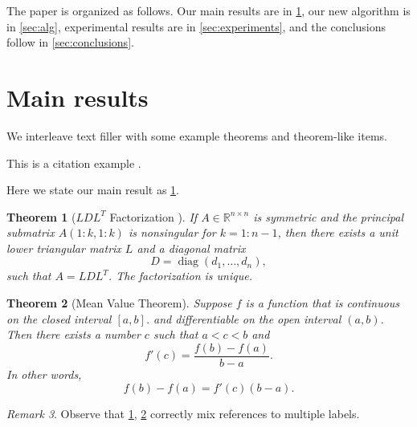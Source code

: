 \documentclass[10pt,reqno,final]{article}
\theoremstyle{plain}
\newtheorem{theorem}{Theorem}[section]
\theoremstyle{definition}
\theoremstyle{remark}
\newtheorem{remark}[theorem]{Remark}
\begin{document}
The paper is organized as follows. Our main results are in
\ref{sec:main}, our new algorithm is in \ref{sec:alg}, experimental
results are in \ref{sec:experiments}, and the conclusions follow in
\ref{sec:conclusions}.

\section{Main results}
\label{sec:main}


We interleave text filler with some example theorems and theorem-like
items.

\lipsum[5]

This is a citation example \cite{WoZhMeSh05}.

Here we state our main result as \ref{thm:bigthm}.

\begin{theorem}[$LDL^T$ Factorization \cite{GoVa13}]\label{thm:bigthm}
  If $A \in \mathbb{R}^{n \times n}$ is symmetric and the principal
  submatrix $A(1:k,1:k)$ is nonsingular for $k=1:n-1$, then there
  exists a unit lower triangular matrix $L$ and a diagonal matrix
  \begin{equation*}
    D = \operatorname{diag}(d_1,\dots,d_n),  %
  \end{equation*}
  such that $A=LDL^T$. The factorization is unique.
\end{theorem}

\lipsum[7]

\begin{theorem}[Mean Value Theorem]\label{thm:mvt}
  Suppose $f$ is a function that is continuous on the closed interval
  $[a,b]$.  and differentiable on the open interval $(a,b)$.
  Then there exists a number $c$ such that $a < c < b$ and
  \begin{equation*}
    f'(c) = \frac{f(b)-f(a)}{b-a}.
  \end{equation*}
  In other words,
  \begin{equation*}
    f(b)-f(a) = f'(c)(b-a).
  \end{equation*}
\end{theorem}

\begin{remark}
Observe that \ref{thm:bigthm}, \ref{thm:mvt} correctly mix references
to multiple labels.
\end{remark}
\end{document}
